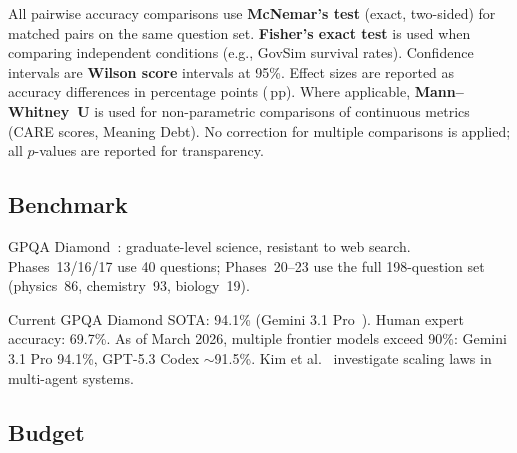 \documentclass[11pt,a4paper]{article}
\newcommand{\pp}{\,pp\xspace}
\begin{document}
All pairwise accuracy comparisons use \textbf{McNemar's test} (exact,
two-sided) for matched pairs on the same question set.
\textbf{Fisher's exact test} is used when comparing independent
conditions (e.g., GovSim survival rates).  Confidence intervals are
\textbf{Wilson score} intervals at 95\%.  Effect sizes are reported as
accuracy differences in percentage points (\pp).  Where applicable,
\textbf{Mann--Whitney~U} is used for non-parametric comparisons of
continuous metrics (CARE scores, Meaning Debt).  No correction for
multiple comparisons is applied; all $p$-values are reported for
transparency.

\subsection{Benchmark}

GPQA Diamond~\cite{rein2024gpqa}: graduate-level science, resistant
to web search.  Phases~13/16/17 use 40 questions; Phases~20--23 use
the full 198-question set (physics~86, chemistry~93, biology~19).

Current GPQA Diamond SOTA: 94.1\% (Gemini 3.1 Pro~\cite{gemini2025}).
Human expert accuracy: 69.7\%.
As of March 2026, multiple frontier models exceed 90\%: Gemini 3.1 Pro
94.1\%, GPT-5.3 Codex $\sim$91.5\%.
Kim et al.~\cite{kim2025scaling} investigate scaling laws in
multi-agent systems.

\subsection{Budget}
\end{document}
